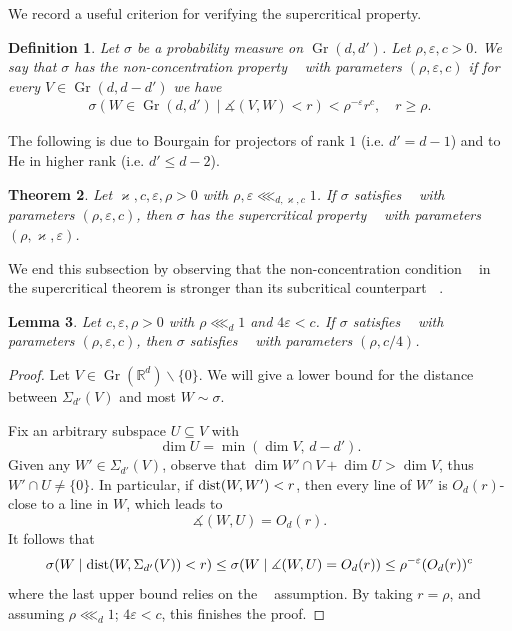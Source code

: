 \documentclass[11pt, leqno, fleqn]{amsart}
\def\eps{\varepsilon}
\newcommand{\margem}[1]{\marginpar{{\scriptsize {#1}}}}
\def\clo{   \color{orange}}
\def \R{{\mathbb R}}
\DeclareMathOperator{\Gr}{Gr}
\DeclareMathOperator{\SupP}{(S^+)}
\DeclareMathOperator{\NCSup}{(NC^+)}
\DeclareMathOperator{\NCSub}{(NC^{-})}
\newcommand{\aryst}{\begin{eqnarray*}}
\newcommand{\earyst}{\end{eqnarray*}}
\newtheorem{thm}{\bf Theorem}[section]
\newtheorem{lemma}[thm]{\bf Lemma}
\newtheorem{defi}[thm]{\bf Definition}
\theoremstyle{definition}
\theoremstyle{definition}
\def\dist{ {\rm dist} }
\begin{document}
 
				We record a useful criterion for verifying the supercritical property.
				 
				 
		 \begin{defi}
 	Let $\sigma$ be a probability measure on $\Gr(d, d')$.  Let $\rho,  \eps, c   > 0$. 
 	We say that $\sigma$ has the \emph{non-concentration property} $\NCSup$ with parameters $(\rho, \eps, c)$ if  for every $V \in \Gr(d, d-d')$ we have 
		 	\aryst
		 	\sigma( W \in \Gr(d, d') \mid  \measuredangle(V, W) < r  ) <  \rho^{- \eps} r^{c}, \quad r \geq \rho.
		 	\earyst
		 \end{defi}
		 
		 The following is due to Bourgain \cite[Theorem 5]{B} for projectors of rank $1$ (i.e. $d'=d-1$) and to He  \cite[Theorem 1]{H} in higher rank (i.e. $d'\leq d-2$).
		 \begin{thm} \label{lem NCtoS}
		 	Let $\varkappa,c, \eps, \rho>0$ with $\rho, \eps \lll_{d, \varkappa, c} 1$. If $\sigma$  satisfies $\NCSup$ with parameters $(\rho, \eps, c)$, then
			  $\sigma$ has the supercritical property $\SupP$ with  parameters $(\rho, \varkappa, \eps)$.
		 \end{thm} 
		  
		  We end this subsection by observing that the non-concentration condition  $\NCSup$ in the supercritical theorem is stronger than its subcritical counterpart $\NCSub$.
		  
		 \begin{lemma} \label{lem NC+toNC-}
		 	Let $c, \eps, \rho>0$ with $\rho \lll_{d} 1$ and $4\eps<c$. 	If $\sigma$ satisfies $\NCSup$ with parameters  $(\rho, \eps, c)$,
		 	then $\sigma$ satisfies $\NCSub$ with parameters   
		 	 $(\rho, c / 4)$.
		 \end{lemma}
		 
		 
		 \begin{proof}
		 Let $V\in \Gr(\R^d)\smallsetminus \{0\}$. We will give a lower bound for the distance between $\Sigma_{d'}(V)$ and most $W\sim \sigma$. 
		 
		 
		 Fix an arbitrary subspace $U\subseteq V$ with 
		 $$\dim U= \min (\dim V, \,d-d').$$
Given any $W'\in  \Sigma_{d'}(V)$, observe that	$\dim W'\cap V+ \dim U >\dim V$, thus
		   $W'\cap U\neq \{0\}$. In particular, if $\dist(W,W')< r$, then every line of $W'$ is  $O_{d}(r)$-close to a line in $W$, which leads to
		 $$ \measuredangle(W,U)=O_{d}(r).$$ 
		 It follows that
		 \aryst
		 \sigma (W   \mid \dist(W,\Sigma_{d'}(V)) <r ) \leq \sigma (W \mid \measuredangle(W,U)  =   O_{d}(r) )\leq \rho^{-\eps} (O_{d}(r))^c
		 \earyst
		 where the last upper bound relies on the  $\NCSup$ assumption. By taking $r=\rho$, and assuming $\rho \lll_{d} 1$; $4\eps<c$, this finishes the proof.		
		 \end{proof}
\end{document}
